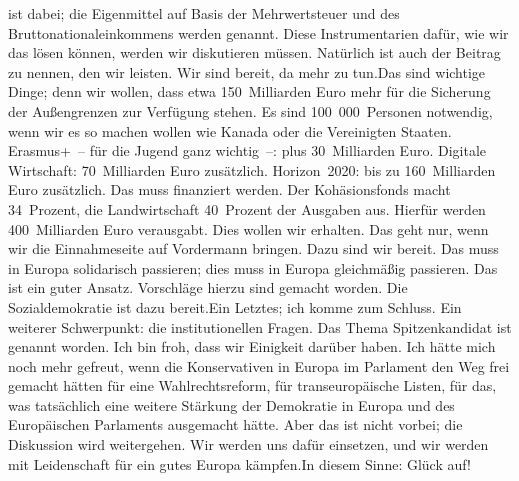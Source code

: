 \documentclass{article}
\begin{document}
ist dabei; die Eigenmittel auf Basis der Mehrwertsteuer und des Bruttonationaleinkommens werden genannt. Diese Instrumentarien dafür, wie wir das lösen können, werden wir diskutieren müssen. Natürlich ist auch der Beitrag zu nennen, den wir leisten. Wir sind bereit, da mehr zu tun.Das sind wichtige Dinge; denn wir wollen, dass etwa 150 Milliarden Euro mehr für die Sicherung der Außengrenzen zur Verfügung stehen. Es sind 100 000 Personen notwendig, wenn wir es so machen wollen wie Kanada oder die Vereinigten Staaten. Erasmus+ – für die Jugend ganz wichtig –: plus 30 Milliarden Euro. Digitale Wirtschaft: 70 Milliarden Euro zusätzlich. Horizon 2020: bis zu 160 Milliarden Euro zusätzlich. Das muss finanziert werden. Der Kohäsionsfonds macht 34 Prozent, die Landwirtschaft 40 Prozent der Ausgaben aus. Hierfür werden 400 Milliarden Euro verausgabt. Dies wollen wir erhalten. Das geht nur, wenn wir die Einnahmeseite auf Vordermann bringen. Dazu sind wir bereit. Das muss in Europa solidarisch passieren; dies muss in Europa gleichmäßig passieren. Das ist ein guter Ansatz. Vorschläge hierzu sind gemacht worden. Die Sozialdemokratie ist dazu bereit.Ein Letztes; ich komme zum Schluss. Ein weiterer Schwerpunkt: die institutionellen Fragen. Das Thema Spitzenkandidat ist genannt worden. Ich bin froh, dass wir Einigkeit darüber haben. Ich hätte mich noch mehr gefreut, wenn die Konservativen in Europa im Parlament den Weg frei gemacht hätten für eine Wahlrechtsreform, für transeuropäische Listen, für das, was tatsächlich eine weitere Stärkung der Demokratie in Europa und des Europäischen Parlaments ausgemacht hätte. Aber das ist nicht vorbei; die Diskussion wird weitergehen. Wir werden uns dafür einsetzen, und wir werden mit Leidenschaft für ein gutes Europa kämpfen.In diesem Sinne: Glück auf!
\end{document}
